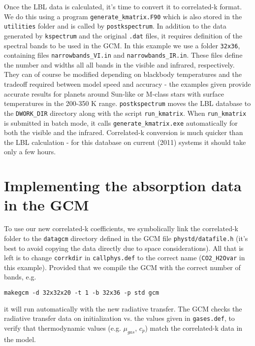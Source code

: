 Once the LBL data is calculated, it's time to convert it to correlated-k format. We do this using a program \verb+generate_kmatrix.F90+ which is also stored in the \verb+utilities+ folder and is called by \verb+postkspectrum+. In addition to the data generated by \verb+kspectrum+ and the original \verb+.dat+ files, it requires definition of the spectral bands to be used in the GCM. In this example we use a folder \verb+32x36+, containing files \verb+narrowbands_VI.in+ and \verb+narrowbands_IR.in+. These files define the number and widths all all bands in the visible and infrared, respectively. They can of course be modified depending on blackbody temperatures and the tradeoff required between model speed and accuracy - the 
 examples given provide accurate results for planets around Sun-like or M-class stars with surface temperatures in the 200-350 K range. {\tt postkspectrum} moves the LBL database to the {\tt DWORK\_DIR} directory along with the script {\tt run\_kmatrix}. When {\tt run\_kmatrix} is submitted in batch mode, it calls \verb+generate_kmatrix.exe+ automatically for both the visible and the infrared. 
Correlated-k conversion is much quicker than the LBL calculation - for this database on current (2011) systems it should take only a few hours.

\section{Implementing the absorption data in the GCM}

To use our new correlated-k coefficients, we symbolically link the correlated-k folder to the {\tt datagcm} directory defined in the GCM file \verb+phystd/datafile.h+ (it's best to avoid copying the data directly due to space considerations). All that is left is to change {\tt corrkdir} in \verb+callphys.def+ to the correct name (\verb+CO2_H2Ovar+ in this example). Provided that we compile the GCM with the correct number of bands, e.g.

\begin{verbatim}
makegcm -d 32x32x20 -t 1 -b 32x36 -p std gcm
\end{verbatim}

it will run automatically with the new radiative transfer. The GCM checks the radiative transfer data on initialization vs. the values given in 
\verb+gases.def+, to verify that thermodynamic values (e.g. $\mu_{gas}$, $c_p$) match the correlated-k data in the model. 
